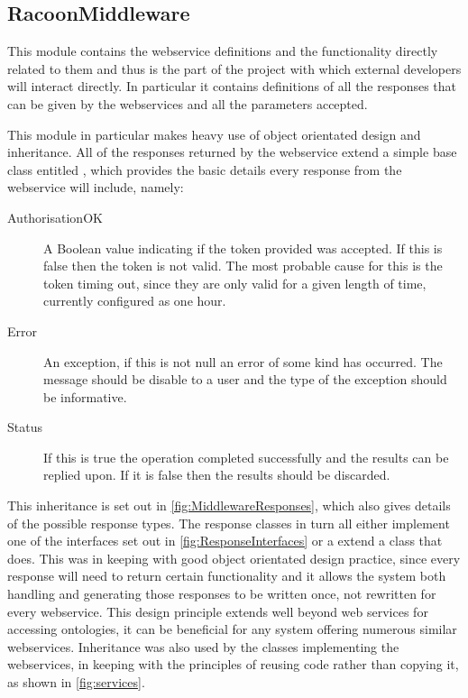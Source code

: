 \subsection{RacoonMiddleware}
This module contains the webservice definitions and the functionality directly related to them and thus is the part of the project with which external developers will interact directly. In particular it contains definitions of all the responses that can be given by the webservices and all the parameters accepted.

This module in particular makes heavy use of object orientated design and inheritance. All of the responses returned by the webservice extend a simple base class entitled , which provides the basic details every response from the webservice will include, namely:
\begin{description}
    \item[AuthorisationOK] A Boolean value indicating if the token provided was accepted. If this is false then the token is not valid. The most probable cause for this is the token timing out, since they are only valid for a given length of time, currently configured as one hour.
    \item[Error] An exception, if this is not null an error of some kind has occurred. The message should be disable to a user and the type of the exception should be informative.
    \item[Status] If this is true the operation completed successfully and the results can be replied upon. If it is false then the results should be discarded. 
\end{description}

This inheritance is set out in \autoref{fig:MiddlewareResponses}, which also gives details of the possible response types. The response classes in turn all either implement one of the interfaces set out in \autoref{fig:ResponseInterfaces} or a extend a class that does. This was in keeping with good object orientated design practice, since every response will need to return certain functionality and it allows the system both handling and generating those responses to be written once, not rewritten for every webservice. This design principle extends well beyond web services for accessing ontologies, it can be beneficial for any system offering numerous similar webservices. Inheritance was also used by the classes implementing the webservices, in keeping with the principles of reusing code rather than copying it, as shown in \autoref{fig:services}.


